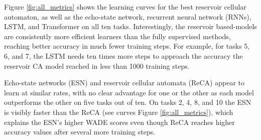 Figure \ref{fig:all_metrics} shows the learning curves for the best reservoir cellular
automaton, as well as the echo-state network, recurrent neural network (RNNs), LSTM, and Transformer
on all ten tasks. Interestingly, the reservoir based-models are consistently more efficient
learners than the fully supervised methods, reaching better accuracy in much
fewer training steps. For example, for tasks 5, 6, and 7, the LSTM needs ten
times more steps to approach the accuracy the reservoir CA model reached in less
than 1000 training steps.

Echo-state networks (ESN) and reservoir cellular automata (ReCA) appear to learn
at similar rates, with no clear advantage for one or the other as each model
outperforms the other on five tasks out of ten. On tasks 2, 4, 8, and 10 the ESN
is visibly faster than the ReCA (see curves Figure \ref{fig:all_metrics}), which
explains the ESN's higher WADE scores even though ReCA reaches higher accuracy
values after several more training steps.

